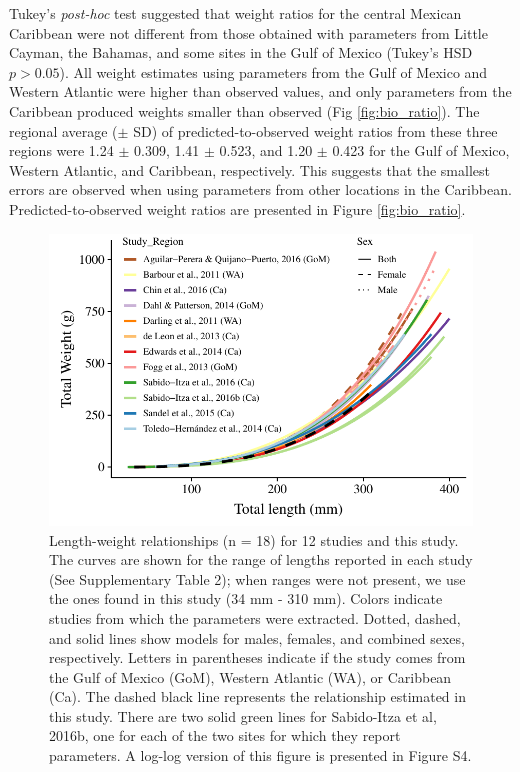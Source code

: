 \documentclass[fleqn,10pt,lineno]{wlpeerj} %
\begin{document}
Tukey's \emph{post-hoc} test suggested that weight ratios for the
central Mexican Caribbean were not different from those obtained with
parameters from Little Cayman, the Bahamas, and some sites in the Gulf
of Mexico (Tukey's HSD \(p > 0.05\)). All weight estimates using
parameters from the Gulf of Mexico and Western Atlantic were higher than
observed values, and only parameters from the Caribbean produced weights
smaller than observed (Fig \ref{fig:bio_ratio}). The regional average
(\(\pm\) SD) of predicted-to-observed weight ratios from these three
regions were 1.24 \(\pm\) 0.309, 1.41 \(\pm\) 0.523, and 1.20 \(\pm\)
0.423 for the Gulf of Mexico, Western Atlantic, and Caribbean,
respectively. This suggests that the smallest errors are observed when
using parameters from other locations in the Caribbean.
Predicted-to-observed weight ratios are presented in Figure
\ref{fig:bio_ratio}.

\begin{figure}
\centering
\includegraphics{Manuscript_files/figure-latex/fit2-1.pdf}
\caption{\label{fig:all_allo}Length-weight relationships (n = 18) for 12
studies and this study. The curves are shown for the range of lengths
reported in each study (See Supplementary Table 2); when ranges were not
present, we use the ones found in this study (34 mm - 310 mm). Colors
indicate studies from which the parameters were extracted. Dotted,
dashed, and solid lines show models for males, females, and combined
sexes, respectively. Letters in parentheses indicate if the study comes
from the Gulf of Mexico (GoM), Western Atlantic (WA), or Caribbean (Ca).
The dashed black line represents the relationship estimated in this
study. There are two solid green lines for Sabido-Itza et al, 2016b, one
for each of the two sites for which they report parameters. A log-log
version of this figure is presented in Figure S4.}
\end{figure}
\end{document}
